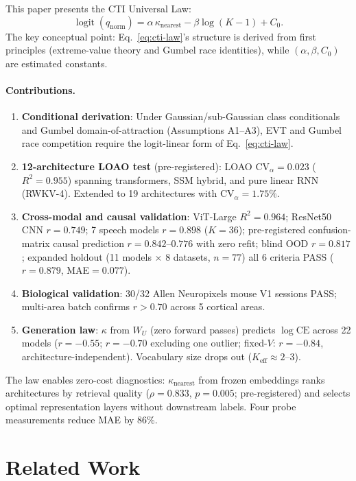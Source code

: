 \documentclass{article}
\DeclareMathOperator{\logit}{logit}
\begin{document}
This paper presents the CTI Universal Law:
\begin{equation}
\label{eq:cti-law}
\logit(q_{\mathrm{norm}})=\alpha\,\kappa_{\mathrm{nearest}}-\beta\log(K-1)+C_0.
\end{equation}
The key conceptual point: Eq.~\ref{eq:cti-law}'s structure is derived from first principles (extreme-value theory and Gumbel race identities), while $(\alpha,\beta,C_0)$ are estimated constants.

\paragraph{Contributions.}
\begin{enumerate}[nosep]
\item \textbf{Conditional derivation}: Under Gaussian/sub-Gaussian class conditionals and Gumbel domain-of-attraction (Assumptions A1--A3), EVT and Gumbel race competition require the logit-linear form of Eq.~\ref{eq:cti-law}.
\item \textbf{12-architecture LOAO test} (pre-registered): LOAO $\mathrm{CV}_\alpha=0.023$ ($R^2=0.955$) spanning transformers, SSM hybrid, and pure linear RNN (RWKV-4). Extended to 19 architectures with $\mathrm{CV}_\alpha=1.75\%$.
\item \textbf{Cross-modal and causal validation}: ViT-Large $R^2=0.964$; ResNet50 CNN $r=0.749$; 7 speech models $r=0.898$ ($K=36$); pre-registered confusion-matrix causal prediction $r=0.842$--$0.776$ with zero refit; blind OOD $r=0.817$; expanded holdout (11 models $\times$ 8 datasets, $n=77$) all 6 criteria PASS ($r=0.879$, MAE$=0.077$).
\item \textbf{Biological validation}: 30/32 Allen Neuropixels mouse V1 sessions PASS; multi-area batch confirms $r>0.70$ across 5 cortical areas.
\item \textbf{Generation law}: $\kappa$ from $W_U$ (zero forward passes) predicts $\log\mathrm{CE}$ across 22 models ($r=-0.55$; $r=-0.70$ excluding one outlier; fixed-$V$: $r=-0.84$, architecture-independent). Vocabulary size drops out ($K_\mathrm{eff}\approx 2$--$3$).
\end{enumerate}
The law enables zero-cost diagnostics: $\kappa_\mathrm{nearest}$ from frozen embeddings ranks architectures by retrieval quality ($\rho=0.833$, $p=0.005$; pre-registered) and selects optimal representation layers without downstream labels. Four probe measurements reduce MAE by 86\%.

\section{Related Work}
\end{document}
